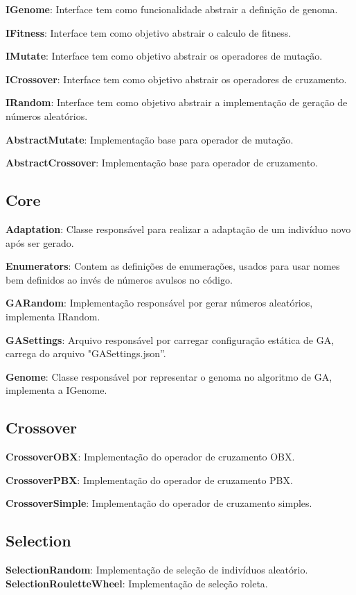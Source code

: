 \textbf{IGenome}: Interface tem como funcionalidade abstrair a definição de genoma.

\textbf{IFitness}: Interface tem como objetivo abstrair o calculo de fitness.

\textbf{IMutate}: Interface tem como objetivo abstrair os operadores de mutação.

\textbf{ICrossover}:  Interface tem como objetivo abstrair os operadores de cruzamento.

\textbf{IRandom}: Interface tem como objetivo abstrair a implementação de geração de números aleatórios.

\textbf{AbstractMutate}: Implementação base para operador de mutação.

\textbf{AbstractCrossover}: Implementação base para operador de cruzamento.

\subsection{Core}

\textbf{Adaptation}: Classe responsável para realizar a adaptação de um indivíduo novo após ser gerado.

\textbf{Enumerators}: Contem as definições de enumerações, usados para usar nomes bem definidos ao invés de números avulsos no código.

\textbf{GARandom}: Implementação responsável por gerar números aleatórios, implementa IRandom.

\textbf{GASettings}: Arquivo responsável por carregar configuração estática de GA, carrega do arquivo "GASettings.json”.

\textbf{Genome}: Classe responsável por representar o genoma no algoritmo de GA, implementa a IGenome.

\subsection{Crossover}
\textbf{CrossoverOBX}: Implementação do operador de cruzamento OBX.

\textbf{CrossoverPBX}: Implementação do operador de cruzamento PBX.

\textbf{CrossoverSimple}:  Implementação do operador de cruzamento simples.

\subsection{Selection}
\textbf{SelectionRandom}: Implementação de seleção de indivíduos aleatório.
\textbf{SelectionRouletteWheel}: Implementação de seleção roleta.

